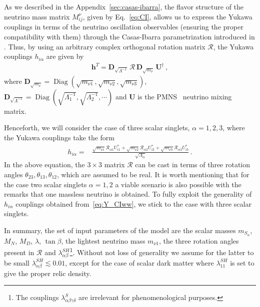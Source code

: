 As we described in the Appendix~\ref{sec:casas-ibarra}, the flavor structure of the neutrino mass matrix $M^{\nu}_{ij}$, given
by Eq.~\eqref{eq:CI}, allows us to express the Yukawa couplings in
terms of the neutrino oscillation observables (ensuring the proper
compatibility with them) through the Casas-Ibarra parametrization introduced in
\cite{Casas:2001sr,Ibarra:2003up}. 
Thus, by using an arbitrary complex orthogonal rotation matrix
$\boldsymbol{\mathcal{R}}$, the Yukawa couplings $h_{i\alpha}$ are
given by
\begin{align}
  \label{eq:ht}
  \mathbf{h}^{T}=\mathbf{D}_{\sqrt{{\Lambda}^{-1}}}\,\boldsymbol{\mathcal{R}}\,\mathbf{D}_{\sqrt{m_{\nu}}}\,\mathbf{U}^{\dagger} \,,
\end{align}
where $\mathbf{D}_{\sqrt{m_\nu}}=\operatorname{Diag}
\left(\sqrt{m_{\nu 1}} , \sqrt{m_{\nu2}},\sqrt{m_{\nu3}}\right)$,
$\mathbf{D}_{\sqrt{\Lambda^{-1}}}=\operatorname{Diag}
\left(\sqrt{\Lambda_1^{-1}} , \sqrt{\Lambda_2^{-1}},\cdots\right)$ and
$\mathbf{U}$ is the PMNS~\cite{Maki:1962mu} neutrino mixing matrix.

Henceforth, we will consider the case of three scalar singlets, $\alpha=1,2,3$,
where the Yukawa couplings take the form
\begin{align}
\label{eq:Y_CIww}
 h_{i\alpha}=&\frac{\sqrt{m_{\nu 1}}{\mathcal{R}}_{\alpha 1}U_{i1}^*+\sqrt{m_{\nu 2}}{\mathcal{R}}_{\alpha 2} U^{*}_{i2}+ \sqrt{m_{\nu 3}}{\mathcal{R}}_{\alpha 3} U^{*}_{i3}}{\sqrt{\Lambda_\alpha}}\,.
\end{align}
In the above equation, the $3\times3$ matrix
$\boldsymbol{\mathcal{R}}$ can be cast in terms of three rotation
angles $\theta_{23},\theta_{13},\theta_{12}$, which are assumed to be real. 
It is worth mentioning that for the case two scalar singlets
$\alpha=1,2$ a viable scenario is also possible with the remarks that
one massless neutrino is obtained. 
To fully exploit the generality of $h_{i\alpha}$ couplings obtained
from~\eqref{eq:Y_CIww}, we stick to the case with three scalar singlets.

In summary, the set of input parameters of the model are the scalar masses
$m_{S_\alpha}$, $M_N$, $M_D$, $\lambda$,
$\tan\beta$, the lightest neutrino mass $m_{\nu1}$, the three rotation 
angles present in $\boldsymbol{\mathcal{R}}$  
and $\lambda^{SH}_{\alpha\beta}$\footnote{The couplings $\lambda^{S}_{\alpha\beta\gamma\delta}$ are irrelevant for phenomenological purposes.}. Without not loss of generality we assume for the latter to be small $\lambda^{SH}_{\alpha\beta}\lesssim0.01$, except for the case of scalar dark matter where $\lambda^{SH}_{11}$ is set to give 
the proper relic density.


